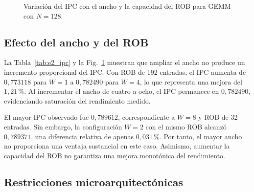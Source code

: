 \documentclass[journal]{IEEEtran}
\begin{document}
\begin{figure}[H]
\centering
{}
\caption{Variación del IPC con el ancho y la capacidad
del ROB para GEMM con $N=128$.}
\label{fig:e2_ipc}
\end{figure}

\subsection{Efecto del ancho y del ROB}

La Tabla~\ref{tab:e2_ipc} y la
Fig.~\ref{fig:e2_ipc} muestran que ampliar el ancho
no produce un incremento proporcional del IPC.
Con ROB de 192 entradas, el IPC aumenta de
$0{,}773118$ para $W=1$ a $0{,}782490$ para $W=4$,
lo que representa una mejora del $1{,}21$\,\%.
Al incrementar el ancho de cuatro a ocho,
el IPC permanece en $0{,}782490$, evidenciando
saturación del rendimiento medido.

El mayor IPC observado fue $0{,}789612$,
correspondiente a $W=8$ y ROB de 32 entradas.
Sin embargo, la configuración $W=2$ con el mismo
ROB alcanzó $0{,}789371$, una diferencia relativa
de apenas $0{,}031$\,\%. Por tanto, el mayor ancho
no proporciona una ventaja sustancial en este caso.
Asimismo, aumentar la capacidad del ROB no
garantiza una mejora monotónica del rendimiento.

\subsection{Restricciones microarquitectónicas}
\end{document}
